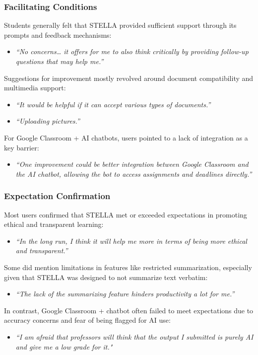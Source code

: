\documentclass[sigconf,natbib=true]{acmart}
\begin{document}
\subsubsection{Facilitating Conditions}
Students generally felt that STELLA provided sufficient support through its prompts and feedback mechanisms:
\begin{itemize}
  \item \textit{“No concerns… it offers for me to also think critically by providing follow-up questions that may help me.”}
\end{itemize}
Suggestions for improvement mostly revolved around document compatibility and multimedia support:
\begin{itemize}
  \item \textit{“It would be helpful if it can accept various types of documents.”}
  \item \textit{“Uploading pictures.”}
\end{itemize}
For Google Classroom + AI chatbots, users pointed to a lack of integration as a key barrier:
\begin{itemize}
  \item \textit{“One improvement could be better integration between Google Classroom and the AI chatbot, allowing the bot to access assignments and deadlines directly.”}
\end{itemize}

\subsubsection{Expectation Confirmation}
Most users confirmed that STELLA met or exceeded expectations in promoting ethical and transparent learning:
\begin{itemize}
  \item \textit{“In the long run, I think it will help me more in terms of being more ethical and transparent.”}
\end{itemize}
Some did mention limitations in features like restricted summarization, especially given that STELLA was designed to not summarize text verbatim:
\begin{itemize}
  \item \textit{“The lack of the summarizing feature hinders productivity a lot for me.”}
\end{itemize}
In contrast, Google Classroom + chatbot often failed to meet expectations due to accuracy concerns and fear of being flagged for AI use:
\begin{itemize}
  \item \textit{“I am afraid that professors will think that the output I submitted is purely AI and give me a low grade for it."}
\end{itemize}
\end{document}
